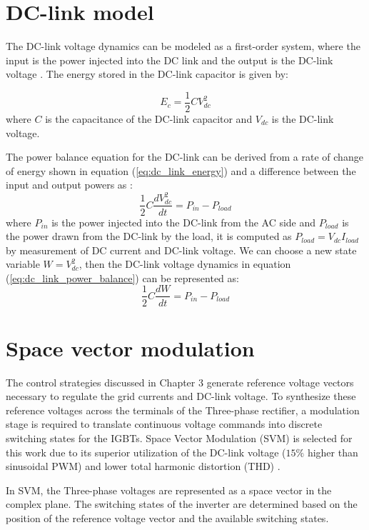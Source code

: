 \section{DC-link model}
The DC-link voltage dynamics can be modeled as a first-order system, where the input is the power
injected into the DC link and the output is the DC-link voltage \cite{sanjuan2010voltage, wang2015pid}. The energy stored in the
DC-link capacitor is given by:\par
\begin{equation}
    E_{c} = \frac{1}{2} C V_{dc}^{2}
    \label{eq:dc_link_energy}
\end{equation}
where $C$ is the capacitance of the DC-link capacitor and $V_{dc}$ is the DC-link voltage.\par
The power balance equation for the DC-link can be derived from a rate of change of energy shown in equation (\ref{eq:dc_link_energy})
and a difference between the input and output powers as \cite{sanjuan2010voltage}:
\begin{equation}
    \frac{1}{2}C \frac{dV^{2}_{dc}}{dt} = P_{in} - P_{load}
    \label{eq:dc_link_power_balance}
\end{equation}
where $P_{in}$ is the power injected into the DC-link from the AC side and $P_{load}$ is the power drawn from the DC-link by the load, it is computed
as $P_{load} = V_{dc} I_{load}$ by measurement of DC current and DC-link voltage.
We can choose a new state variable $W = V_{dc}^{2}$, then the DC-link voltage dynamics in equation (\ref{eq:dc_link_power_balance}) can be represented as:
\begin{equation}
    \frac{1}{2}C \frac{dW}{dt} = P_{in} - P_{load}
    \label{eq:dc_link_dynamics}
\end{equation}
\section{Space vector modulation}
The control strategies discussed in Chapter 3 generate reference voltage vectors necessary to regulate the grid currents
and DC-link voltage. To synthesize these reference voltages across the terminals of the Three-phase rectifier, a modulation
stage is required to translate continuous voltage commands into discrete switching states for the IGBTs.
Space Vector Modulation (SVM) is selected for this work due to its superior utilization of the DC-link voltage
($15\%$ higher than sinusoidal PWM) and lower total harmonic distortion (THD) \cite{wang2015pid,ELNAGAR2023265}.\par
In SVM, the Three-phase voltages are represented as a space vector in the complex plane. The switching states
of the inverter are determined based on the position of the reference voltage vector and the available switching
states.\par
